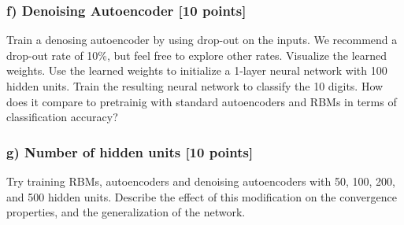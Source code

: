 \documentclass[10pt]{article}
\begin{document}
\subsubsection*{f) Denoising Autoencoder [10 points]}
Train a denosing autoencoder by using drop-out on the inputs. We recommend a drop-out rate of 10\%, but feel free to explore other rates.
Visualize the learned weights. Use the learned 
weights to initialize a 1-layer neural network with 100 hidden units.
Train the resulting neural network to classify the 10 digits.
How does it compare to pretrainig with standard autoencoders and RBMs
in terms of classification accuracy?


\subsubsection*{g) Number of hidden units [10 points]}
Try training RBMs, autoencoders and denoising autoencoders with 
50, 100, 200, and 500  hidden units.
Describe the effect of this modification on the convergence properties, and the
generalization of the network.
\end{document}
